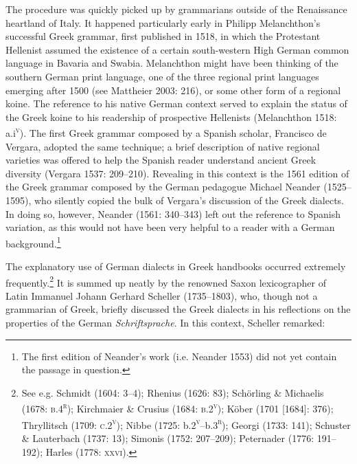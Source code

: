 \documentclass[12pt]{article}
\newenvironment{styleStandard}{\renewcommand\baselinestretch{1.25}\setlength\leftskip{0in}\setlength\rightskip{0in}\setlength\parindent{0.1972in}\setlength\parfillskip{0pt plus 1fil}\setlength\parskip{0in plus 1pt}\writerlistparindent\writerlistleftskip\leavevmode\normalfont\normalsize\writerlistlabel\ignorespaces}{\unskip\vspace{0in plus 1pt}\par}
\newcommand\writerlistleftskip{}
\newcommand\writerlistparindent{}
\newcommand\writerlistlabel{}
\begin{document}
\begin{styleStandard}
The procedure was quickly picked up by grammarians outside of the Renaissance heartland of Italy. It happened particularly early in Philipp Melanchthon’s successful Greek grammar, first published in 1518, in which the Protestant Hellenist assumed the existence of a certain south-western High German common language in Bavaria and Swabia. Melanchthon might have been thinking of the southern German print language, one of the three regional print languages emerging after 1500 (see Mattheier 2003: 216), or some other form of a regional koine. The reference to his native German context served to explain the status of the Greek koine to his readership of prospective Hellenists (Melanchthon 1518: a.i\textsc{\textsuperscript{v}}). The first Greek grammar composed by a Spanish scholar, Francisco de Vergara, adopted the same technique; a brief description of native regional varieties was offered to help the Spanish reader understand ancient Greek diversity (Vergara 1537: 209–210). Revealing in this context is the 1561 edition of the Greek grammar composed by the German pedagogue Michael Neander (1525–1595), who silently copied the bulk of Vergara’s discussion of the Greek dialects. In doing so, however, Neander (1561: 340–343) left out the reference to Spanish variation, as this would not have been very helpful to a reader with a German background.\footnote{ The first edition of Neander’s work (i.e. Neander 1553) did not yet contain the passage in question.}
\end{styleStandard}

\begin{styleStandard}
The explanatory use of German dialects in Greek handbooks occurred extremely frequently.\footnote{ See e.g. Schmidt (1604: 3–4); Rhenius (1626: 83); Schörling \& Michaelis (1678: \textsc{b.4}\textsc{\textsuperscript{r}}); Kirchmaier \& Crusius (1684: \textsc{b.2}\textsc{\textsuperscript{v}}); Köber (1701 [1684]: 376); Thryllitsch (1709: \textsc{c.2}\textsc{\textsuperscript{v}}); Nibbe (1725: b.2\textsc{\textsuperscript{v}}\textsc{–}b.3\textsc{\textsuperscript{r}}); Georgi (1733: 141); Schuster \& Lauterbach (1737: 13); Simonis (1752: 207–209); Peternader (1776: 191–192); Harles (1778: \textsc{xxvi}).} It is summed up neatly by the renowned Saxon lexicographer of Latin Immanuel Johann Gerhard Scheller (1735–1803), who, though not a grammarian of Greek, briefly discussed the Greek dialects in his reflections on the properties of the German \textit{Schriftsprache}. In this context, Scheller remarked:
\end{styleStandard}
\end{document}
